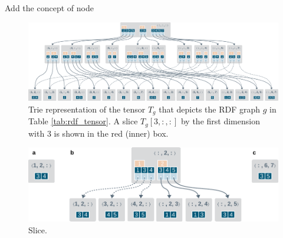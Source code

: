 
Add the concept of node 
\clearpage

\begin{figure}
		\centering
		\includegraphics[scale=0.78]{figures/chapter2/hypertrie4}
		\caption{Trie representation of the tensor $T_g$ that depicts the RDF graph $g$ in  Table \ref{tab:rdf_tensor}. A slice $T_g[3, :, :]$ by the first dimension with 3 is shown in the red (inner) box.}
		\label{fig:rdf_hypertrie}
\end{figure}

\begin{figure}[h]
	\centering
	\includegraphics{figures/chapter2/hypertrie4_slices}
	\caption{Slice.}
	\label{fig:rdf_hypertrie_slice}
\end{figure}
\clearpage